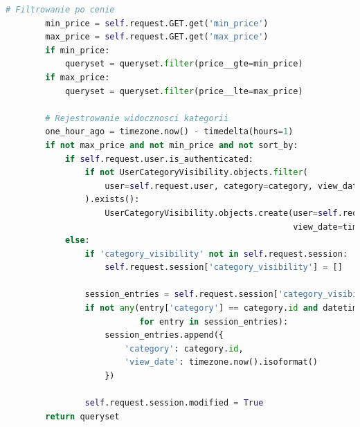 \documentclass[12pt,a4paper,oneside]{article}
\theoremstyle{definition}
\numberwithin{equation}{section}
\begin{document}
\begin{itemize}
\begin{lstlisting}[language=Python, caption=Kod widoku CategoryProductsView]
        # Filtrowanie po cenie
        min_price = self.request.GET.get('min_price')
        max_price = self.request.GET.get('max_price')
        if min_price:
            queryset = queryset.filter(price__gte=min_price)
        if max_price:
            queryset = queryset.filter(price__lte=max_price)

        # Rejestrowanie widocznosci kategorii
        one_hour_ago = timezone.now() - timedelta(hours=1)
        if not max_price and not min_price and not sort_by:
            if self.request.user.is_authenticated:
                if not UserCategoryVisibility.objects.filter(
                    user=self.request.user, category=category, view_date__gte=one_hour_ago
                ).exists():
                    UserCategoryVisibility.objects.create(user=self.request.user, category=category,
                                                          view_date=timezone.now())
            else:
                if 'category_visibility' not in self.request.session:
                    self.request.session['category_visibility'] = []

                session_entries = self.request.session['category_visibility']
                if not any(entry['category'] == category.id and datetime.fromisoformat(entry['view_date']) >= one_hour_ago
                           for entry in session_entries):
                    session_entries.append({
                        'category': category.id,
                        'view_date': timezone.now().isoformat()
                    })

                self.request.session.modified = True
        return queryset
\end{lstlisting}


\end{itemize}
\end{document}
